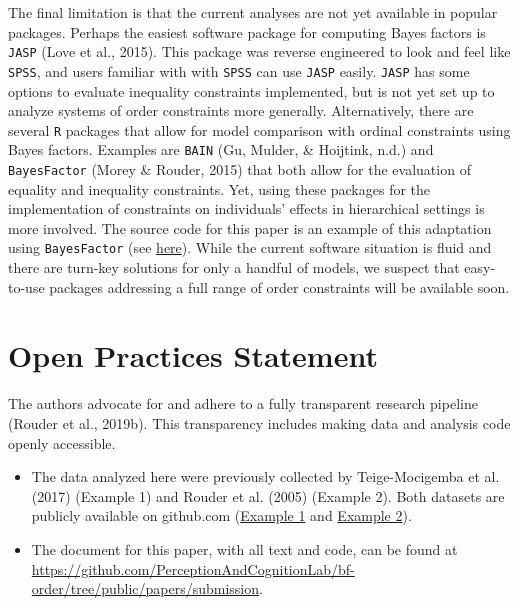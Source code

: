 \documentclass[english,,man]{apa6}
\begin{document}
The final limitation is that the current analyses are not yet available in popular packages. Perhaps the easiest software package for computing Bayes factors is \texttt{JASP} (Love et al., 2015). This package was reverse engineered to look and feel like \texttt{SPSS}, and users familiar with with \texttt{SPSS} can use \texttt{JASP} easily. \texttt{JASP} has some options to evaluate inequality constraints implemented, but is not yet set up to analyze systems of order constraints more generally. Alternatively, there are several \texttt{R} packages that allow for model comparison with ordinal constraints using Bayes factors. Examples are \texttt{BAIN} (Gu, Mulder, \& Hoijtink, n.d.) and \texttt{BayesFactor} (Morey \& Rouder, 2015) that both allow for the evaluation of equality and inequality constraints. Yet, using these packages for the implementation of constraints on individuals' effects in hierarchical settings is more involved. The source code for this paper is an example of this adaptation using \texttt{BayesFactor} (see \href{https://github.com/PerceptionAndCognitionLab/bf-order/tree/public/papers/submission}{here}). While the current software situation is fluid and there are turn-key solutions for only a handful of models, we suspect that easy-to-use packages addressing a full range of order constraints will be available soon.

\hypertarget{open-practices-statement}{%
\section{Open Practices Statement}\label{open-practices-statement}}

The authors advocate for and adhere to a fully transparent research pipeline (Rouder et al., 2019b). This transparency includes making data and analysis code openly accessible.

\begin{itemize}
\item
  The data analyzed here were previously collected by Teige-Mocigemba et al. (2017) (Example 1) and Rouder et al. (2005) (Example 2). Both datasets are publicly available on github.com (\href{https://osf.io/vcz4a/}{Example 1} and \href{https://raw.githubusercontent.com/PerceptionCognitionLab/data0/master/lexDec-dist5/ld5.all}{Example 2}).
\item
  The document for this paper, with all text and code, can be found at \url{https://github.com/PerceptionAndCognitionLab/bf-order/tree/public/papers/submission}.
\end{itemize}
\end{document}
